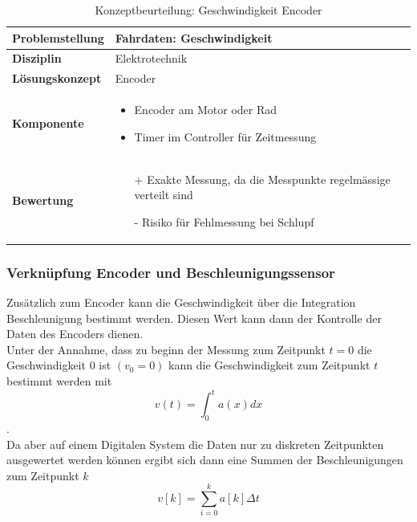\documentclass[../../main.tex]{subfiles}
\begin{document}
    \begin{flushleft}
        \begin{table}[H]
        \begin{tabular}{ | l | p{11cm} |}
        \hline
        \textbf{Problemstellung} & Fahrdaten: Geschwindigkeit \\ \hline
        \textbf{Disziplin} & Elektrotechnik \\ \hline
        \textbf{Lösungskonzept} & Encoder\\ \hline
        \textbf{Komponente} & \begin{itemize}
            \item Encoder am Motor oder Rad
            \item Timer im Controller für Zeitmessung
            \end{itemize}\\ \hline
        \textbf{Bewertung} &  \begin{itemize}
                                \item[+] Exakte Messung, da die Messpunkte regelmässige verteilt sind
                                \item[-] Risiko für Fehlmessung bei Schlupf
                              \end{itemize} \\ \hline
        \end{tabular}
        \caption{Konzeptbeurteilung: Geschwindigkeit Encoder}
        \label{tab:fahr_Third_Party_Sensorik}
    \end{table}
    \end{flushleft}

    \subsubsection{Verknüpfung Encoder und Beschleunigungssensor}
    Zusätzlich zum Encoder kann die Geschwindigkeit über die Integration Beschleunigung bestimmt werden. Diesen Wert kann dann der Kontrolle der Daten des Encoders dienen.\\
    Unter der Annahme, dass zu beginn der Messung zum Zeitpunkt $t = 0$ die Geschwindigkeit $0$ ist $(v_0 = 0)$ kann die Geschwindigkeit zum Zeitpunkt $t$ bestimmt werden mit $$v(t) = \int_{0}^{t} a(x) dx$$.\\
    Da aber auf einem Digitalen System die Daten nur zu diskreten Zeitpunkten ausgewertet werden können ergibt sich dann eine Summen der Beschleunigungen zum Zeitpunkt $k$ $$v[k] = \sum_{i=0}^{k}a[k] \Delta t$$ 
\end{document}
